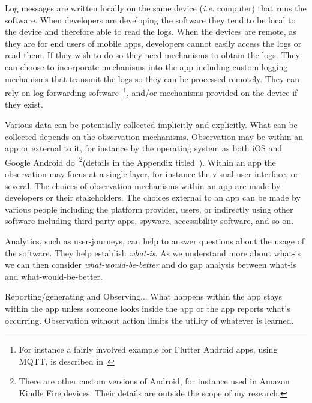 Log messages are written locally on the same device (\textit{i.e.} computer) that runs the software. When developers are developing the software they tend to be local to the device and therefore able to read the logs. When the devices are remote, as they are for end users of mobile apps, developers cannot easily access the logs or read them. If they wish to do so they need mechanisms to obtain the logs. They can choose to incorporate mechanisms into the app including custom logging mechanisms that transmit the logs so they can be processed remotely. They can rely on log forwarding software~\footnote{For instance a fairly involved example for Flutter Android apps, using MQTT, is described in~\citep{adil2020_sending_logs_from_flutter_apps}}, and/or mechanisms provided on the device if they exist. 


Various data can be potentially collected implicitly and explicitly. What can be collected depends on the observation mechanisms. Observation may be within an app or external to it, for instance by the operating system as both iOS  and Google Android do~\footnote{There are other custom versions of Android, for instance used in Amazon Kindle Fire devices. Their details are outside the scope of my research.}(details in the Appendix titled~\href{chapter-on-mobile-analytics}{\emph{}}). Within an app the observation may focus at a single layer, for instance the visual user interface, or several. The choices of observation mechanisms within an app are made by developers or their stakeholders. The choices external to an app can be made by various people including the platform provider, users, or indirectly using other software including third-party apps, spyware, accessibility software, and so on.

Analytics, such as user-journeys, can help to answer questions about the usage of the software. They help establish \emph{what-is}. As we understand more about what-is we can then consider \emph{what-would-be-better} and do gap analysis between what-is and what-would-be-better.

Reporting/generating and Observing... What happens within the app stays within the app unless someone looks inside the app or the app reports what's occurring. Observation without action limits the utility of whatever is learned. 

